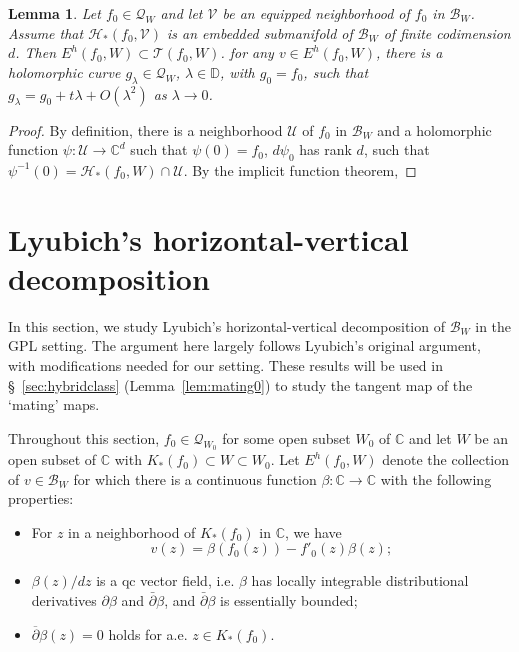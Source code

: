 \documentclass{amsart}
\numberwithin{equation}{section}
\newtheorem{lemma}[theorem]{Lemma}%
\newcommand{\C}{\mathbb C}
\theoremstyle{definition}
\theoremstyle{remark}
\begin{document}
\begin{lemma} Let $f_0\in \mathcal{Q}_W$ and let $\mathcal{V}$ be an equipped neighborhood of $f_0$ in $\mathcal{B}_W$. Assume that $\mathcal{H}_*(f_0,\mathcal{V})$ is an embedded submanifold of $\mathcal{B}_W$ of finite codimension $d$. 
Then $E^h(f_0,W)\subset \mathcal{T}(f_0,W)$. for any $v\in E^h(f_0,W)$, there is a holomorphic curve $g_\lambda\in \mathcal{Q}_W$, $\lambda\in\mathbb{D}$, with $g_0=f_0$, such that $g_\lambda= g_0+ t\lambda+O(\lambda^2)$ as $\lambda\to 0$. 
\end{lemma}
\begin{proof} By definition, there is a neighborhood $\mathcal{U}$ of $f_0$ in $\mathcal{B}_W$ and a holomorphic function $\psi: \mathcal{U}\to \C^d$ such that $\psi(0)=f_0$, $d\psi_{0}$ has rank $d$, such that $\psi^{-1}(0)=\mathcal{H}_*(f_0, W)\cap \mathcal{U}$. By the implicit function theorem, 
\end{proof}
\fi

\section{Lyubich's horizontal-vertical decomposition}\label{sec:lyubichdecomp}
In this section, we study Lyubich's horizontal-vertical decomposition of $\mathcal{B}_W$ in the GPL setting. The argument here largely follows Lyubich's original argument, with modifications needed for our setting. These results will be used in \S~\ref{sec:hybridclass} (Lemma~\ref{lem:mating0}) to study the tangent map of the `mating' maps. 




Throughout this section, $f_0\in \mathcal{Q}_{W_0}$ for some open subset $W_0$ of $\C$ and let $W$ be an open subset of $\C$ with 
$K_*(f_0)\subset W\subset W_0.$
Let $E^h(f_0, W)$ denote the collection of $v\in \mathcal{B}_W$ for which there is a continuous function $\beta: \mathbb{C} \to \mathbb{C}$ with the following properties: 
\begin{itemize}
\item For $z$ in a neighborhood of $K_*(f_0)$ in $\C$, we have
\begin{equation}\label{eqn:horizontal}
v(z)=\beta(f_0(z))-f'_0(z)\beta(z);
\end{equation}
\item $\beta(z)/dz$ is a qc vector field, i.e. $\beta$ has locally integrable distributional derivatives $\partial\beta$ and $\bar{\partial}\beta$, and $\bar{\partial} \beta$ is essentially bounded;
\item $\overline{\partial} \beta(z) =0$ holds for a.e. $z\in K_*(f_0)$.  
\end{itemize}
\end{document}
